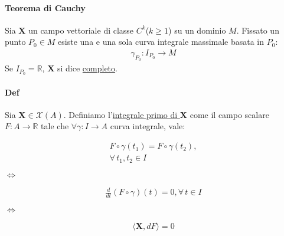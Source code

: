 \documentclass[10pt,a4paper]{book}
\begin{document}
\paragraph*{Teorema di Cauchy} Sia $\mathbf{X}$ un campo vettoriale di classe $C^k$($k\ge1$) su un dominio $M$.
Fissato un punto $P_0\in M$ esiste una e una sola curva integrale massimale basata in $P_0$:
\begin{align*}
    \gamma_{P_0}\colon I_{P_0}\to M
\end{align*}
Se $I_{P_0}=\mathbb{R}$, $\mathbf{X}$ si dice \underline{completo}.
%
%
%
%
%
\paragraph*{Def} Sia $\mathbf{X}\in \mathcal{X}(A)$. Definiamo l'\underline{integrale primo di $\mathbf{X}$} come il campo scalare $F\colon A\to \mathbb{R}$ tale che $\forall \gamma \colon I \to A$ curva integrale, vale:\\
\begin{minipage}{4cm}
    \begin{align*}
   F\circ \gamma (t_1)=F\circ \gamma (t_2),\\
   \forall\, t_1,t_2\in I
    \end{align*}
    \end{minipage}$\iff$
    \begin{minipage}{4cm}
   \begin{align*}
    \frac{d}{dt}(F\circ\gamma)(t)=0, \forall \, t\in I
   \end{align*}
    \end{minipage}$\iff$
    \begin{minipage}{3cm}
        \begin{align*}
         \langle \mathbf{X},dF\rangle =0
        \end{align*}
         \end{minipage}
\end{document}
